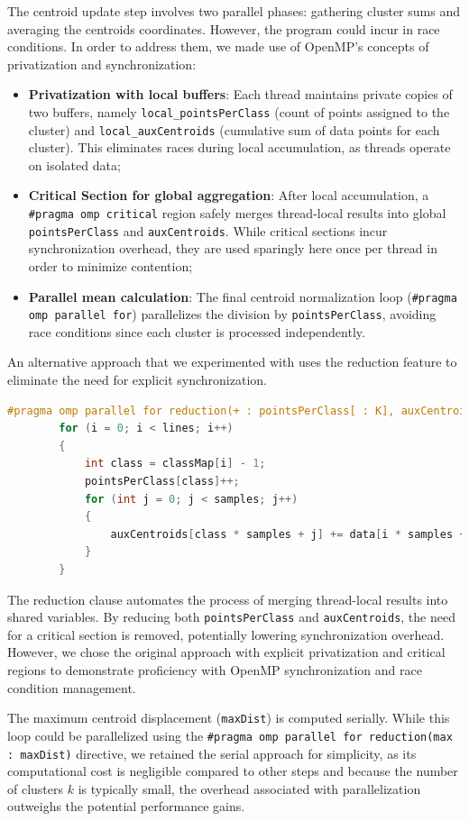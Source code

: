 \documentclass[11pt, journal]{IEEEtran}
\newcommand{\nwl}{

\vspace{11pt}

}
\begin{document}
The centroid update step involves two parallel phases: gathering cluster sums and averaging the centroids coordinates. However, the program could incur in race conditions. In order to address them, we made use of OpenMP's concepts of privatization and synchronization:
\begin{itemize}
    \item \textbf{Privatization with local buffers}: Each thread maintains private copies of two buffers, namely \texttt{local\_pointsPerClass} (count of points assigned to the cluster) and \texttt{local\_auxCentroids} (cumulative sum of data points for each cluster). This eliminates races during local accumulation, as threads operate on isolated data;
    \item \textbf{Critical Section for global aggregation}: After local accumulation, a \texttt{\#pragma omp critical} region safely merges thread-local results into global \texttt{pointsPerClass} and \texttt{auxCentroids}. While critical sections incur synchronization overhead, they are used sparingly here once per thread in order to minimize contention;
    \item \textbf{Parallel mean calculation}: The final centroid normalization loop (\texttt{\#pragma omp parallel for}) parallelizes the division by \texttt{pointsPerClass}, avoiding race conditions since each cluster is processed independently.
\end{itemize}
\nwl
An alternative approach that we experimented with uses the reduction feature to eliminate the need for explicit synchronization.
\nwl
\begin{lstlisting}[language = C]
#pragma omp parallel for reduction(+ : pointsPerClass[ : K], auxCentroids[ : K * samples])
		for (i = 0; i < lines; i++)
		{
			int class = classMap[i] - 1;
			pointsPerClass[class]++;
			for (int j = 0; j < samples; j++)
			{
				auxCentroids[class * samples + j] += data[i * samples + j];
			}
		}\end{lstlisting}
\nwl
The reduction clause automates the process of merging thread-local results into shared variables. By reducing both \texttt{pointsPerClass} and \texttt{auxCentroids}, the need for a critical section is removed, potentially lowering synchronization overhead.
However, we chose the original approach with explicit privatization and critical regions to demonstrate proficiency with OpenMP synchronization and race condition management. 
\nwl
The maximum centroid displacement (\texttt{maxDist}) is computed serially. While this loop could be parallelized using the \texttt{\#pragma omp parallel for reduction(max : maxDist)} directive, we retained the serial approach for simplicity, as its computational cost is negligible compared to other steps and because the number of clusters $k$ is typically small, the overhead associated with parallelization outweighs the potential performance gains.
\end{document}

